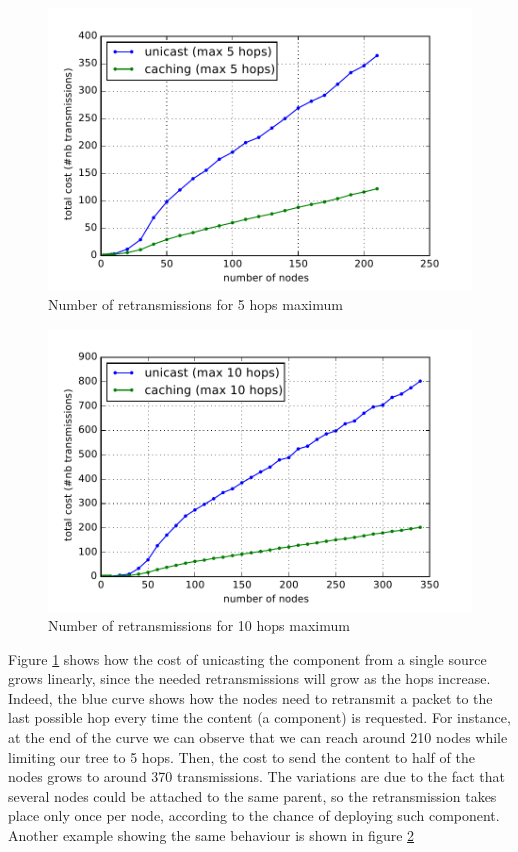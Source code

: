\begin{figure}[]
	\centering
	\includegraphics[width=0.8 \columnwidth]{chapters/calpulli.images/nb-of-retransmitions-5.pdf}
	\caption{Number of retransmissions for 5 hops maximum} \label{fig:NumberOfRetransmission5hops}
\end{figure}

\begin{figure}[]
	\centering
	\includegraphics[width=0.8 \columnwidth]{chapters/calpulli.images/nb-of-retransmitions-10.pdf}
	\caption{Number of retransmissions for 10 hops maximum} \label{fig:NumberOfRetransmission10hops}
\end{figure}

Figure \ref{fig:NumberOfRetransmission5hops} shows how the cost of unicasting the component from a single source grows linearly, since the needed retransmissions will grow as the hops increase.
Indeed, the blue curve shows how the nodes need to retransmit a packet to the last possible hop every time the content (a component) is requested.
For instance, at the end of the curve we can observe that we can reach around 210 nodes while limiting our tree to 5 hops.
Then, the cost to send the content to half of the nodes grows to around 370 transmissions.
The variations are due to the fact that several nodes could be attached to the same parent, so the retransmission takes place only once per node, according to the chance of deploying such component.
Another example showing the same behaviour is shown in figure \ref{fig:NumberOfRetransmission10hops}

